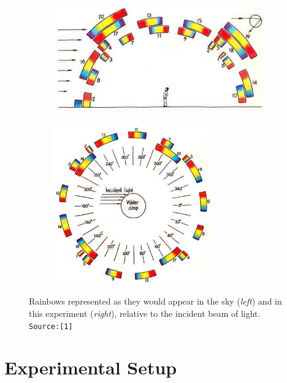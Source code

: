  
\begin{figure}[!htb]
    \centering
    \begin{subfigure}[b]{0.5\linewidth}
    \centering
    \includegraphics[width=\textwidth]{figs/multipleRainbows.jpeg}
    \end{subfigure}%
    \begin{subfigure}[b]{0.5\linewidth}
    \centering
    \includegraphics[width=0.75\textwidth]{figs/multipleRainbowsLab.jpeg}
    \end{subfigure}
    \caption{Rainbows represented as they would appear in the sky (\textit{left}) and in this experiment (\textit{right}), relative to the incident beam of light. \texttt{Source:[1]}}
    \label{fig:rainbow}
\end{figure}

 
\section*{Experimental Setup}


